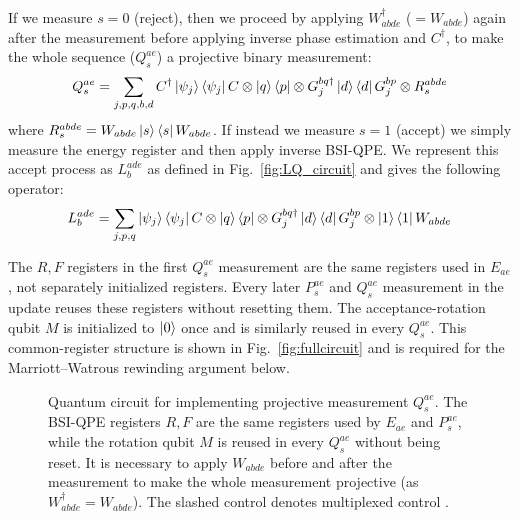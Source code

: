 If we measure $s=0$ (reject), then we proceed by applying $W_{abde}^{\dagger}$ ($=W_{abde}$) again after the measurement before applying inverse phase estimation and $C^{\dagger}$, to make the whole sequence ($Q_s^{ae}$) a projective binary measurement:
\begin{equation} 
    Q_s^{ae} = \sum_{j,p,q,b,d}  C^{\dagger}\ket{\psi_j}\bra{\psi_j}C \otimes \ket{q}\bra{p} \otimes G_j^{bq\dagger}\ket{d}\bra{d}G_j^{bp}\otimes R^{abde}_s
\end{equation}
where $R^{abde}_s = W_{abde}\ket{s}\bra{s}W_{abde}$. If instead we measure $s=1$ (accept) we simply measure the energy register and then apply inverse BSI-QPE. We represent this accept process as $L^{ade}_b$ as defined in Fig.~\ref{fig:LQ_circuit} and gives the following operator:
\begin{equation}
    L^{ade}_b =\sum_{j,p,q}\ket{\psi_j}\bra{\psi_j}C \otimes \ket{q}\bra{p} \otimes G^{bq\dagger}_j \ket{d}\bra{d}G^{bp}_j \otimes \ket{1}\bra{1}W_{abde}
\end{equation}

The $R,F$ registers in the first $Q_s^{ae}$ measurement are the same registers used in $E_{ae}$, not separately initialized registers. Every later $P_s^{ae}$ and $Q_s^{ae}$ measurement in the update reuses these registers without resetting them. The acceptance-rotation qubit $M$ is initialized to $\ket{0}$ once and is similarly reused in every $Q_s^{ae}$. This common-register structure is shown in Fig.~\ref{fig:fullcircuit} and is required for the Marriott--Watrous rewinding argument below.
\begin{figure}[htbp]
    \centering
{}

\caption{Quantum circuit for implementing projective measurement $Q_s^{ae}$. The BSI-QPE registers $R, F$ are the same registers used by $E_{ae}$ and $P_s^{ae}$, while the rotation qubit $M$ is reused in every $Q_s^{ae}$ without being reset. It is necessary to apply $W_{abde}$ before and after the measurement to make the whole measurement projective (as $W_{abde}^{\dagger}=W_{abde}$). The slashed control denotes multiplexed control \cite{low2024trading}.}
\label{fig:Qcircuit}
\end{figure}

